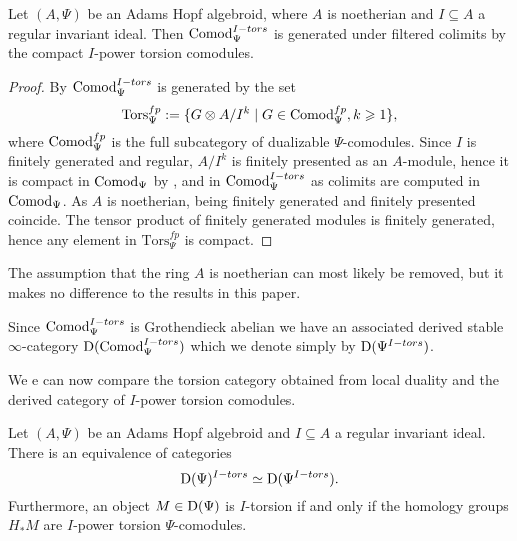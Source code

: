 \begin{lemma}
    \label{ch1:lm:torsion-comodules-generated-by-compacts}
    Let $(A,\Psi)$ be an Adams Hopf algebroid, where $A$ is noetherian and $I\subseteq A$ a regular invariant ideal. Then $\mathrm{Comod}_\Psi^{I-tors}$ is generated under filtered colimits by the compact $I$-power torsion comodules. 
\end{lemma}
\begin{proof}
    By \cite[3.4]{barthel-heard-valenzuela_2020} $\mathrm{Comod}_\Psi^{I-tors}$ is generated by the set 
    $$\mathrm{Tors}_\Psi^{fp}:=\{G\otimes A/I^k \mid G \in \mathrm{Comod}_\Psi^{fp}, k\geqslant 1\},$$
    where $\mathrm{Comod}_\Psi^{fp}$ is the full subcategory of dualizable $\Psi$-comodules. Since $I$ is finitely generated and regular, $A/I^k$ is finitely presented as an $A$-module, hence it is compact in $\mathrm{Comod}_\Psi$ by \cite[1.4.2]{hovey_04}, and in $\mathrm{Comod}_\Psi^{I-tors}$ as colimits are computed in $\mathrm{Comod}_\Psi$. As $A$ is noetherian, being finitely generated and finitely presented coincide. The tensor product of finitely generated modules is finitely generated, hence any element in $\mathrm{Tors}_\Psi^{fp}$ is compact. 
\end{proof}

\begin{remark}
    The assumption that the ring $A$ is noetherian can most likely be removed, but it makes no difference to the results in this paper.  
\end{remark}

\begin{notation}
    Since $\mathrm{Comod}_\Psi^{I-tors}$ is Grothendieck abelian we have an associated derived stable $\infty$-category $\mathrm{D}(\mathrm{Comod}_\Psi^{I-tors})$ which we denote simply by $\mathrm{D}(\Psi^{I-tors})$.
\end{notation}

We e can now compare the torsion category obtained from local duality and the derived category of $I$-power torsion comodules. 

\begin{lemma}
    \label{ch1:lm:derived-torsion-if-homology-torsion}
    Let $(A,\Psi)$ be an Adams Hopf algebroid and $I\subseteq A$ a regular invariant ideal. There is an equivalence of categories 
    $$\mathrm{D}(\Psi)^{I-tors}\simeq \mathrm{D}(\Psi^{I-tors}).$$ 
    Furthermore, an object $M\in \mathrm{D}(\Psi)$ is $I$-torsion if and only if the homology groups $H_* M$ are $I$-power torsion $\Psi$-comodules.
\end{lemma}

